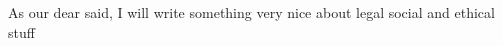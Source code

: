 As our dear \citep{HerbertF:1965:Dune} said, I will write something very nice about
legal social and ethical stuff
